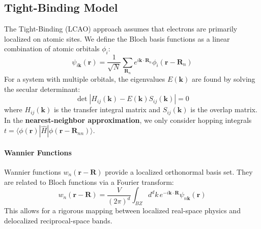 \documentclass[10pt, a4paper]{article}
\begin{document}
\subsection{Tight-Binding Model}
The Tight-Binding (LCAO) approach assumes that electrons are primarily localized on atomic sites. We define the Bloch basis functions as a linear combination of atomic orbitals $\phi_i$:
\begin{equation}
    \psi_{i\mathbf{k}}(\mathbf{r}) = \frac{1}{\sqrt{N}} \sum_{\mathbf{R}_n} e^{i\mathbf{k} \cdot \mathbf{R}_n} \phi_i(\mathbf{r} - \mathbf{R}_n)
\end{equation}
For a system with multiple orbitals, the eigenvalues $E(\mathbf{k})$ are found by solving the secular determinant:
\begin{equation}
    \det | H_{ij}(\mathbf{k}) - E(\mathbf{k}) S_{ij}(\mathbf{k}) | = 0
\end{equation}
where $H_{ij}(\mathbf{k})$ is the transfer integral matrix and $S_{ij}(\mathbf{k})$ is the overlap matrix. In the \textbf{nearest-neighbor approximation}, we only consider hopping integrals $t = \langle \phi(\mathbf{r}) | \hat{H} | \phi(\mathbf{r}-\mathbf{R}_{nn}) \rangle$.

\paragraph{Wannier Functions}
Wannier functions $w_n(\mathbf{r}-\mathbf{R})$ provide a localized orthonormal basis set. They are related to Bloch functions via a Fourier transform:
\begin{equation}
    w_n(\mathbf{r} - \mathbf{R}) = \frac{V}{(2\pi)^d} \int_{BZ} d^d k \, e^{-i\mathbf{k} \cdot \mathbf{R}} \psi_{n\mathbf{k}}(\mathbf{r})
\end{equation}
This allows for a rigorous mapping between localized real-space physics and delocalized reciprocal-space bands.
\end{document}
